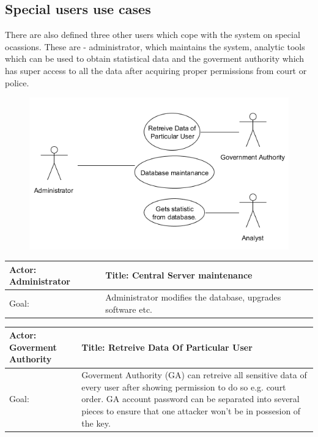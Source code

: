 \subsection{Special users use cases}

There are also defined three other users which cope with the system on special ocassions.
These are - administrator, which maintains the system, analytic tools which can be used to obtain statistical data and the goverment authority which has super access to all the data after acquiring proper permissions from court or police.

\begin{figure}[h]
\begin{center}
\includegraphics[width=1\textwidth]{database/specialUseCases.png}
\end{center}
\end{figure} 


    \begin{longtable}{| p{6cm} | p{7.75cm} |}
    \hline
    Actor: Administrator &Title: Central Server maintenance \\ \hline
    Goal: & Administrator modifies the database, upgrades software etc. \\ \hline
    \end{longtable}



    \begin{longtable}{| p{6cm} | p{7.75cm} |}
    \hline
    Actor: Goverment Authority &Title: Retreive Data Of Particular User \\ \hline
    Goal: & Goverment Authority (GA) can retreive all sensitive data of every user after showing permission to do so e.g. court order. GA account password can be separated into several pieces to ensure that one attacker won't be in possesion of the key. \\ \hline
    \end{longtable}



